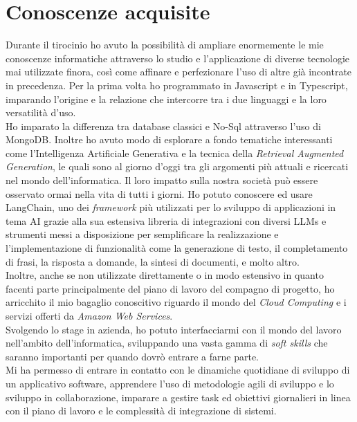 \newpage
\section{Conoscenze acquisite}
Durante il tirocinio ho avuto la possibilità di ampliare enormemente le mie conoscenze informatiche attraverso lo studio e l'applicazione di diverse tecnologie mai utilizzate finora, così come affinare e perfezionare l'uso di altre già incontrate in precedenza. 
Per la prima volta ho programmato in Javascript e in Typescript, imparando l'origine e la relazione che intercorre tra i due linguaggi e la loro versatilità d'uso.\\
Ho imparato la differenza tra database classici e No-Sql attraverso l'uso di MongoDB.
Inoltre ho avuto modo di esplorare a fondo tematiche interessanti come l'Intelligenza Artificiale Generativa e la tecnica della \textit{Retrieval Augmented Generation}, le quali sono al giorno d'oggi tra gli argomenti più attuali e ricercati nel mondo dell'informatica. 
Il loro impatto sulla nostra società può essere osservato ormai nella vita di tutti i giorni.
Ho potuto conoscere ed usare LangChain, uno dei \textit{framework} più utilizzati per lo sviluppo di applicazioni 
in tema AI grazie alla sua estensiva libreria di integrazioni con diversi LLMs e strumenti messi a 
disposizione per semplificare la realizzazione e l'implementazione di funzionalità come la generazione 
di testo, il completamento di frasi, la risposta a domande, la sintesi di documenti, e molto altro.\\
Inoltre, anche se non utilizzate direttamente o in modo estensivo in quanto facenti parte principalmente 
del piano di lavoro del compagno di progetto, ho arricchito il mio bagaglio conoscitivo riguardo il 
mondo del \textit{Cloud Computing} e i servizi offerti da \textit{Amazon Web Services}.\\

Svolgendo lo stage in azienda, ho potuto interfacciarmi con il mondo del lavoro nell'ambito dell'informatica, sviluppando una vasta gamma di \textit{soft skills} che saranno importanti per quando
dovrò entrare a farne parte.\\
Mi ha permesso di entrare in contatto con le dinamiche quotidiane di sviluppo di un applicativo 
software, apprendere l'uso di metodologie agili di sviluppo e lo sviluppo in collaborazione, imparare a gestire task ed obiettivi giornalieri in linea con il piano di lavoro e le complessità di integrazione di sistemi.\\


